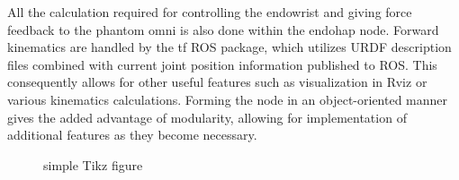 All the calculation required for controlling the endowrist and giving force feedback to the phantom omni is also done within the endohap node. Forward kinematics are handled by the tf ROS package, which utilizes URDF description files combined with current joint position information published to ROS.
This consequently allows for other useful features such as visualization in Rviz or various kinematics calculations.
Forming the node in an object-oriented manner gives the added advantage of modularity, allowing for implementation of additional features as they become necessary. 

\begin{figure}[H]
\centering
{}%
\caption{simple Tikz figure}
\end{figure}

